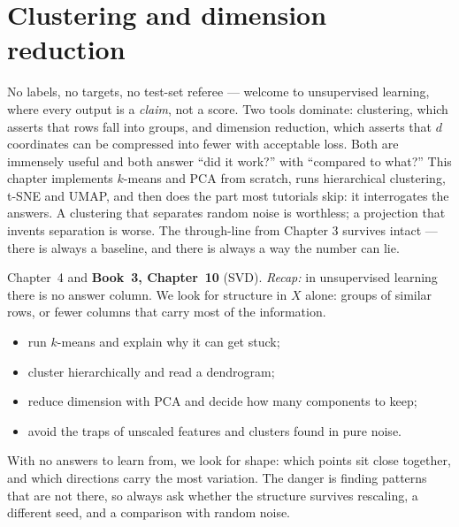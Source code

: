\chapter{Clustering and dimension reduction}\label{ch:cluster}

No labels, no targets, no test-set referee --- welcome to unsupervised
learning, where every output is a \emph{claim}, not a score. Two tools
dominate: clustering, which asserts that rows fall into groups, and
dimension reduction, which asserts that $d$ coordinates can be compressed
into fewer with acceptable loss. Both are immensely useful and both answer
``did it work?'' with ``compared to what?'' This chapter implements
$k$-means and PCA from scratch, runs hierarchical clustering, t-SNE and
UMAP, and then does the part most tutorials skip: it interrogates the
answers. A clustering that separates random noise is worthless; a
projection that invents separation is worse. The through-line from
Chapter 3 survives intact --- there is always a baseline, and there is
always a way the number can lie.

\begin{rulebox}
Chapter~4 and \textbf{Book~3, Chapter~10} (SVD). \emph{Recap:} in unsupervised learning there is no answer column. We look for structure in $X$ alone: groups of similar rows, or fewer columns that carry most of the information.
\end{rulebox}
\begin{wins}
\begin{itemize}
\item run $k$-means and explain why it can get stuck;
\item cluster hierarchically and read a dendrogram;
\item reduce dimension with PCA and decide how many components to keep;
\item avoid the traps of unscaled features and clusters found in pure noise.
\end{itemize}
\end{wins}
\begin{principle}
With no answers to learn from, we look for shape: which points sit close together, and which directions carry the most variation. The danger is finding patterns that are not there, so always ask whether the structure survives rescaling, a different seed, and a comparison with random noise.
\end{principle}

